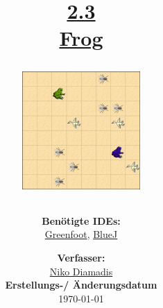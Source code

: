 \documentclass{scrartcl}   %
\begin{document}
\title{\huge{\href{https://www.inf-schule.de/programmierung/oopjava/implementierung/frog}{2.3\\Frog}}\\
\vspace{0.5cm}
\begin{figure}[ht]
	\centering
	\includegraphics[height=4.5cm]{Frog.png}
\end{figure}
\vspace{2cm}}

\author{\textbf{Benötigte IDEs:}\\
\href{https://www.greenfoot.org/}{Greenfoot}, \href{https://www.bluej.org/}{BlueJ}
\vspace{2cm}}

\date{\textbf{Verfasser:}\\
\href{https://nikothegreek.jimdofree.com/}{Niko Diamadis}\\
\vspace{0.5cm}
\textbf{Erstellungs-/ Änderungsdatum}\\
\today\enlargethispage{4cm}}

\doublespacing

\maketitle\thispagestyle{empty}

\cleardoublepage

\setcounter{page}{1}
\tableofcontents


\newpage
{}  %
\end{document}
